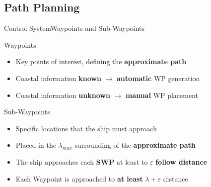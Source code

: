 \subsection{Path Planning}
\begin{frame}{Control System}{Waypoints and Sub-Waypoints}
    \begin{block}{Waypoints}
		\begin{itemize}
			\item Key points of interest, defining the \textbf{approximate path}
			\item Coastal information \textbf{known} $\rightarrow$ \textbf{automatic} WP generation
			\item Coastal information \textbf{unknown} $\rightarrow$ \textbf{manual} WP placement
		\end{itemize}
    \end{block}
    \begin{block}{Sub-Waypoints}
		\begin{itemize}
			\item Specific locations that the ship must approach
			\item Placed in the $\lambda_{max}$ surrounding of the \textbf{approximate path}
			\item The ship approaches each \textbf{SWP} at least to $\varepsilon$ \textbf{follow distance}
			\item Each Waypoint is approached to \textbf{at least} $\lambda + \varepsilon$ distance
		\end{itemize}
	\end{block}
\end{frame}

